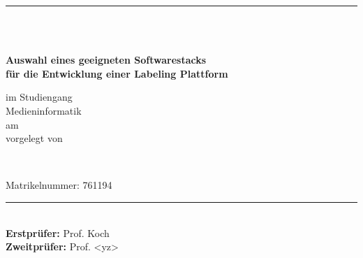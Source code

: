 \newcommand{\HRule}[2]{\noindent\rule[#1]{\linewidth}{#2}}
\newcommand{\vlinespace}[1]{\vspace*{#1\baselineskip}}
\newcommand{\titleemph}[1]{\textbf{#1}}
\begin{titlepage}
    \sffamily
    \hfill
    \HRule{13pt}{1pt}
    \centering
    \vlinespace{5}\\
    \workTyp\\
    \begin{Large}
        \textbf{Auswahl eines geeigneten Softwarestacks }\\
        \textbf{für die Entwicklung einer Labeling Plattform}\\
    \end{Large}
    \vlinespace{4}
    im Studiengang\\
    Medieninformatik\\
    am \workDatum\\
    \vlinespace{4}
    vorgelegt von\\
    \begin{Large}
        \textbf{\workNameStudent}\\
    \end{Large}
    \vlinespace{1}
    Matrikelnummer: 761194
    \vfill
    \raggedright{}
    \HRule{13pt}{1pt} \\
    \titleemph{Erstprüfer:} Prof. Koch\\
    \titleemph{Zweitprüfer:} Prof. <yz>
\end{titlepage}